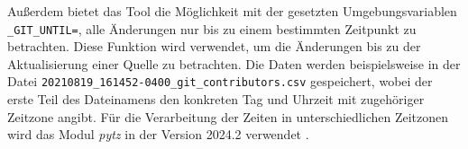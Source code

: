 Außerdem bietet das Tool die Möglichkeit mit der gesetzten Umgebungsvariablen \texttt{\_GIT\_UNTIL=}, alle Änderungen nur bis zu einem bestimmten Zeitpunkt zu betrachten.
Diese Funktion wird verwendet, um die Änderungen bis zu der Aktualisierung einer Quelle zu betrachten.
Die Daten werden beispielsweise in der Datei \texttt{20210819\_161452-0400\_git\_contributors.csv} gespeichert, wobei der erste Teil des Dateinamens den konkreten Tag und Uhrzeit mit zugehöriger Zeitzone angibt.
Für die Verarbeitung der Zeiten in unterschiedlichen Zeitzonen wird das Modul \emph{pytz} in der Version 2024.2 verwendet \autocite{bishop_stub42pytz_2024}.
